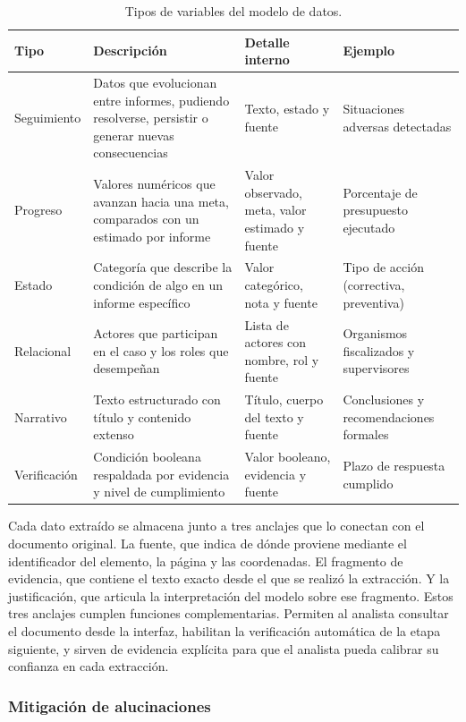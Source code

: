 \begin{table}[t]
\centering
\caption{Tipos de variables del modelo de datos.}
\label{tab:tipos_variables}
\renewcommand{\arraystretch}{1.5}
\begin{tabular}{@{}p{2.1cm} p{4.5cm} p{4cm} p{3.2cm}@{}}
\toprule
\textbf{Tipo} & \textbf{Descripción} & \textbf{Detalle interno} 
& \textbf{Ejemplo} \\
\midrule
\rowcolor{rowgray}
Seguimiento  & Datos que evolucionan entre informes, pudiendo 
resolverse, persistir o generar nuevas consecuencias & Texto, 
estado y fuente & Situaciones adversas detectadas \\
Progreso     & Valores numéricos que avanzan hacia una meta, 
comparados con un estimado por informe & Valor observado, meta, 
valor estimado y fuente & Porcentaje de presupuesto ejecutado \\
\rowcolor{rowgray}
Estado       & Categoría que describe la condición de algo en 
un informe específico & Valor categórico, nota y fuente & 
Tipo de acción (correctiva, preventiva) \\
Relacional   & Actores que participan en el caso y los roles 
que desempeñan & Lista de actores con nombre, rol y fuente & 
Organismos fiscalizados y supervisores \\
\rowcolor{rowgray}
Narrativo    & Texto estructurado con título y contenido 
extenso & Título, cuerpo del texto y fuente & Conclusiones y 
recomendaciones formales \\
Verificación & Condición booleana respaldada por evidencia y 
nivel de cumplimiento & Valor booleano, evidencia y fuente & 
Plazo de respuesta cumplido \\
\bottomrule
\end{tabular}
\end{table}

Cada dato extraído se almacena junto a tres anclajes que lo 
conectan con el documento original. La fuente, que indica de 
dónde proviene mediante el identificador del elemento, la 
página y las coordenadas. El fragmento de evidencia, que 
contiene el texto exacto desde el que se realizó la extracción. 
Y la justificación, que articula la interpretación del modelo 
sobre ese fragmento. Estos tres anclajes cumplen funciones 
complementarias. Permiten al analista consultar el documento 
desde la interfaz, habilitan la verificación automática de la 
etapa siguiente, y sirven de evidencia explícita para que el 
analista pueda calibrar su confianza en cada extracción.

\subsubsection{Mitigación de alucinaciones}

